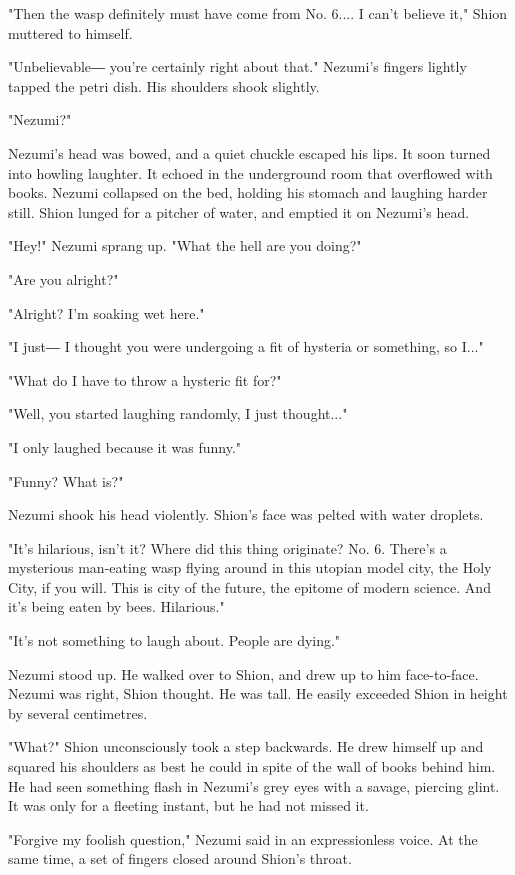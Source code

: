 "Then the wasp definitely must have come from No. 6.... I can't believe
it," Shion muttered to himself.

"Unbelievable― you're certainly right about that." Nezumi's fingers
lightly tapped the petri dish. His shoulders shook slightly.

"Nezumi?"

Nezumi's head was bowed, and a quiet chuckle escaped his lips. It soon
turned into howling laughter. It echoed in the underground room that
overflowed with books. Nezumi collapsed on the bed, holding his stomach
and laughing harder still. Shion lunged for a pitcher of water, and
emptied it on Nezumi's head.

"Hey!" Nezumi sprang up. "What the hell are you doing?"

"Are you alright?"

"Alright? I'm soaking wet here."

"I just― I thought you were undergoing a fit of hysteria or something,
so I..."

"What do I have to throw a hysteric fit for?"

"Well, you started laughing randomly, I just thought..."

"I only laughed because it was funny."

"Funny? What is?"

Nezumi shook his head violently. Shion's face was pelted with water
droplets.

"It's hilarious, isn't it? Where did this thing originate? No. 6.
There's a mysterious man-eating wasp flying around in this utopian model
city, the Holy City, if you will. This is city of the future, the
epitome of modern science. And it's being eaten by bees. Hilarious."

"It's not something to laugh about. People are dying."

Nezumi stood up. He walked over to Shion, and drew up to him
face-to-face. Nezumi was right, Shion thought. He was tall. He easily
exceeded Shion in height by several centimetres.

"What?" Shion unconsciously took a step backwards. He drew himself up
and squared his shoulders as best he could in spite of the wall of books
behind him. He had seen something flash in Nezumi's grey eyes with a
savage, piercing glint. It was only for a fleeting instant, but he had
not missed it.

"Forgive my foolish question," Nezumi said in an expressionless voice.
At the same time, a set of fingers closed around Shion's throat.

